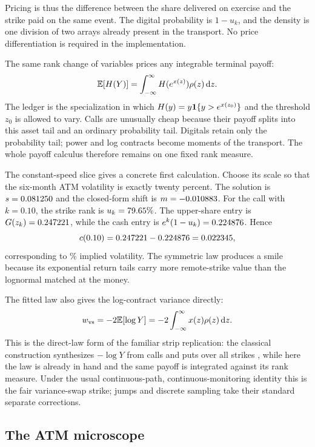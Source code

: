Pricing is thus the difference between the share delivered on exercise and
the strike paid on the same event.  The digital probability is $1-u_k$, and
the density is one division of two arrays already present in the transport.
No price differentiation is required in the implementation.

The same rank change of variables prices any integrable terminal payoff:
\begin{equation}
\mathbb{E}[H(Y)]=\int_{-\infty}^{\infty}H(e^{x(z)})\rho(z)\,\mathrm{d} z.
\label{eq:generalpayoff}
\end{equation}
The ledger is the specialization in which $H(y)=y\mathbf{1}\{y>e^{x(z_0)}\}$ and
the threshold $z_0$ is allowed to vary.  Calls are unusually cheap because
their payoff splits into this asset tail and an ordinary probability tail.
Digitals retain only the probability tail; power and log contracts become
moments of the transport.  The whole payoff calculus therefore remains on one
fixed rank measure.

The constant-speed slice gives a concrete first calculation.  Choose its
scale so that the six-month ATM volatility is exactly twenty percent.  The
solution is $s=0.081250$ and the closed-form shift is $m=-0.010883$.
For the call with $k=0.10$, the strike rank is
$u_k=79.65\%$.  The upper-share entry is
$G(z_k)=0.247221$, while the cash entry is
$e^k(1-u_k)=0.224876$.  Hence
\[
c(0.10)=0.247221-0.224876=0.022345,
\]
corresponding to \MacToyIvOtmPct\% implied volatility.  The symmetric law
produces a smile because its exponential return tails carry more remote-strike
value than the lognormal matched at the money.

The fitted law also gives the log-contract variance directly:
\begin{equation}
w_{\rm vs}=-2\mathbb{E}[\log Y]
=-2\int_{-\infty}^{\infty}x(z)\rho(z)\,\mathrm{d} z.
\label{eq:varswap}
\end{equation}
This is the direct-law form of the familiar strip replication: the classical
construction synthesizes $-\log Y$ from calls and puts over all strikes
\citep{Neuberger1994,DemeterfiDermanKamalZou1999}, while here the law is
already in hand and the same payoff is integrated against its rank measure.
Under the usual continuous-path, continuous-monitoring identity this is the
fair variance-swap strike; jumps and discrete sampling take their standard
separate corrections.

\subsection{The ATM microscope}

